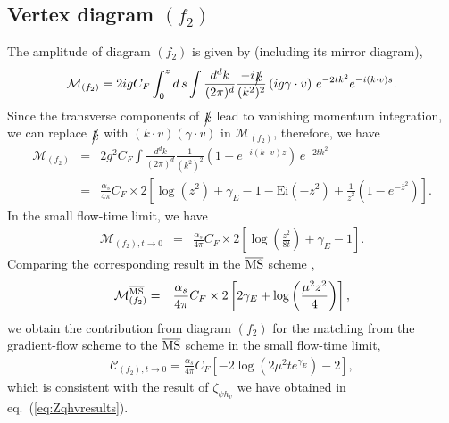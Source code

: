 \subsection{Vertex diagram $(f_2)$}
The amplitude of diagram $(f_2)$ is given by (including its mirror diagram),
\begin{eqnarray}
\mathcal{M}_{(f_2)} =2igC_F \int_0^z d\, s\int \frac{d^d k}{(2\pi)^d} \frac{-i\slashed{k}}{(k^2)^2} \left(ig\gamma\cdot v\right)\, e^{-2t k^2} e^{-i(k\cdot v)s}.
\end{eqnarray}
Since the transverse components of $\slashed{k}$ lead to vanishing momentum integration, we can replace $\slashed{k}$ with $(k\cdot v)(\gamma\cdot v)$ in $\mathcal{M}_{(f_2)}$, therefore, we have
\begin{eqnarray}
\label{eq:resultsdiagramd}
\mathcal{M}_{(f_2)} &=& 2g^2C_F \int \frac{d^d k}{(2\pi)^d} \frac{1}{(k^2)^2} \left(1-e^{-i(k\cdot v) z}\right)\, e^{-2t k^2} \nonumber\\
&=& \frac{\alpha_s}{4\pi}C_F\times 2\left[\log\left(\bar{z}^2\right) + \gamma_E - 1 -\text{Ei}\left(-\bar{z}^2\right) + \frac{1}{\bar{z}^2}\left(1-e^{-\bar{z}^2}\right)\right].
\end{eqnarray}
In the small flow-time limit, we have
\begin{eqnarray}
\mathcal{M}_{(f_2), t\rightarrow 0} &=&\frac{\alpha_s}{4\pi}C_F\times 2\left[\log\left(\frac{z^2}{8t}\right) + \gamma_E - 1 \right].
\end{eqnarray}
Comparing the corresponding result in the $\overline{\rm MS}$ scheme \cite{Izubuchi:2018srq},
\begin{eqnarray}
\mathcal{M}_{(f_2)}^{\overline{\rm MS}} &=&\frac{\alpha_s}{4\pi}C_F\times 2\left[2\gamma_E  +\log\left(\frac{\mu^2z^2}{4}\right) \right],
\end{eqnarray}
we obtain the contribution from diagram $(f_2)$ for the matching from the gradient-flow scheme to the $\overline{\rm MS}$ scheme in the small flow-time limit,
\begin{eqnarray}
\label{eq:quarkvertexGF2MS}
\mathcal{C}_{(f_2), t\rightarrow 0} = \frac{\alpha_s}{4\pi}C_F\left[-2\log\left(2\mu^2te^{\gamma_E}\right)  -2 \right],
\end{eqnarray}
which is consistent with the result of $\zeta_{\psi h_v}$ we have obtained in eq.~(\ref{eq:Zqhvresults}).


